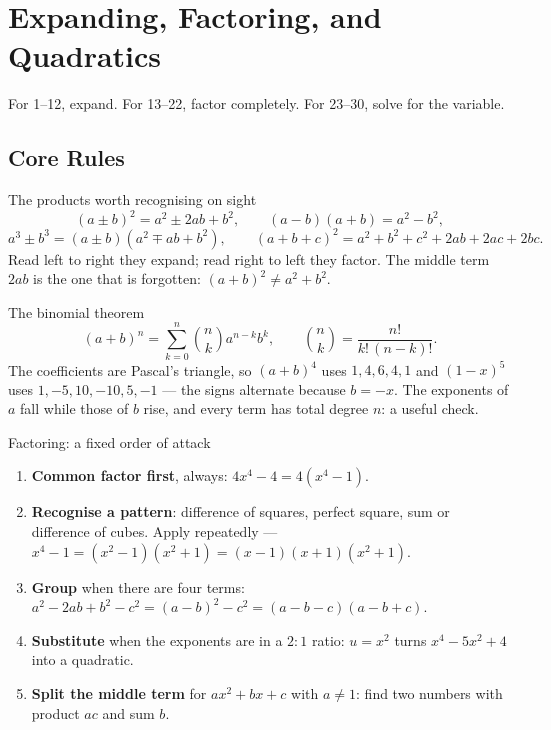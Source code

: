 \chapter{Expanding, Factoring, and Quadratics}

For 1--12, expand. For 13--22, factor completely. For 23--30, solve for
the variable.

\section{Core Rules}

\begin{rulebox}{The products worth recognising on sight}
\[
  (a\pm b)^{2}=a^{2}\pm2ab+b^{2},\qquad
  (a-b)(a+b)=a^{2}-b^{2},
\]
\[
  a^{3}\pm b^{3}=(a\pm b)(a^{2}\mp ab+b^{2}),\qquad
  (a+b+c)^{2}=a^{2}+b^{2}+c^{2}+2ab+2ac+2bc .
\]
Read left to right they expand; read right to left they factor. The middle
term $2ab$ is the one that is forgotten: $(a+b)^{2}\neq a^{2}+b^{2}$.
\end{rulebox}

\begin{rulebox}{The binomial theorem}
\[
  (a+b)^{n}=\sum_{k=0}^{n}\binom{n}{k}a^{n-k}b^{k},
  \qquad \binom{n}{k}=\frac{n!}{k!\,(n-k)!} .
\]
The coefficients are Pascal's triangle, so $(a+b)^{4}$ uses
$1,4,6,4,1$ and $(1-x)^{5}$ uses $1,-5,10,-10,5,-1$ --- the signs alternate
because $b=-x$. The exponents of $a$ fall while those of $b$ rise, and every
term has total degree $n$: a useful check.
\end{rulebox}

\begin{rulebox}{Factoring: a fixed order of attack}
\begin{enumerate}[leftmargin=1.6em,itemsep=0.3ex]
  \item \textbf{Common factor first}, always: $4x^{4}-4=4(x^{4}-1)$.
  \item \textbf{Recognise a pattern}: difference of squares, perfect square,
        sum or difference of cubes. Apply repeatedly ---
        $x^{4}-1=(x^{2}-1)(x^{2}+1)=(x-1)(x+1)(x^{2}+1)$.
  \item \textbf{Group} when there are four terms:
        $a^{2}-2ab+b^{2}-c^{2}=(a-b)^{2}-c^{2}=(a-b-c)(a-b+c)$.
  \item \textbf{Substitute} when the exponents are in a $2\!:\!1$ ratio:
        $u=x^{2}$ turns $x^{4}-5x^{2}+4$ into a quadratic.
  \item \textbf{Split the middle term} for $ax^{2}+bx+c$ with $a\neq1$: find
        two numbers with product $ac$ and sum $b$.
\end{enumerate}
\end{rulebox}

